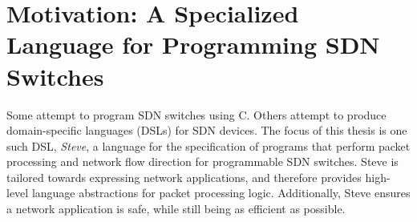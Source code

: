 %
%
%
%
%

\section{Motivation: A Specialized Language for Programming SDN Switches}

Some attempt to program SDN switches using C.
Others attempt to produce domain-specific languages (DSLs) for SDN devices.
The focus of this thesis is one such DSL, \emph{Steve}, a language for the specification of programs that perform packet processing and network flow direction 
for programmable SDN switches. 
Steve is tailored towards expressing network applications, and therefore provides high-level language abstractions for packet processing logic.
Additionally, Steve ensures a network application is safe, while still being as efficient as possible.

